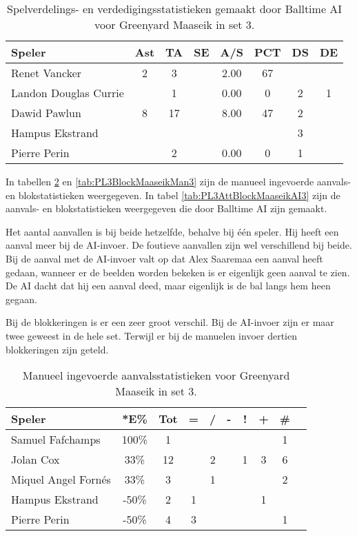 \begin{table}[ht!]
  \centering
  \scriptsize
    \begin{tabular}{|l|c|c|c|c|c|c|c|} \hline
    \textbf{Speler} & Ast & TA & SE & A/S & PCT & DS & DE \\ \hline
    Renet Vancker & 2 & 3 &  & 2.00 & 67 &   &   \\
    Landon Douglas Currie &  & 1 &  & 0.00 & 0 & 2 & 1 \\
    Dawid Pawlun & 8 & 17 & & 8.00 & 47 & 2 &  \\
    Hampus Ekstrand &  &  &  &  &  & 3 &  \\
    Pierre Perin &  & 2 &  & 0.00 & 0 & 1 &  \\ \hline
  \end{tabular}
  \caption[Spelverdelings- en verdedigingsstatistieken gemaakt door Balltime AI voor Greenyard Maaseik in set 3]{\label{tab:PL3SetDigMaaseikAI3}Spelverdelings- en verdedigingsstatistieken gemaakt door Balltime AI voor Greenyard Maaseik in set 3.}
\end{table}

In tabellen \ref{tab:PL3AttMaaseikMan3} en \ref{tab:PL3BlockMaaseikMan3} zijn de manueel ingevoerde aanvals- en blokstatistieken weergegeven. In tabel \ref{tab:PL3AttBlockMaaseikAI3} zijn de aanvals- en blokstatistieken weergegeven die door Balltime AI zijn gemaakt. 

Het aantal aanvallen is bij beide hetzelfde, behalve bij één speler. Hij heeft een aanval meer bij de AI-invoer. De foutieve aanvallen zijn wel verschillend bij beide. Bij de aanval met de AI-invoer valt op dat Alex Saaremaa een aanval heeft gedaan, wanneer er de beelden worden bekeken is er eigenlijk geen aanval te zien. De AI dacht dat hij een aanval deed, maar eigenlijk is de bal langs hem heen gegaan.

Bij de blokkeringen is er een zeer groot verschil. Bij de AI-invoer zijn er maar twee geweest in de hele set. Terwijl er bij de manuelen invoer dertien blokkeringen zijn geteld.

\begin{table}[ht!]
    \centering
    \scriptsize
    \begin{tabular}{|l|c|c|c|c|c|c|c|c|c|} \hline
        \textbf{Speler} & *E\% & Tot & = & / & - & ! & + & \#\\ \hline
        Samuel Fafchamps & 100\% & 1 &  &  &  &  &  & 1 \\ 
        Jolan Cox & 33\% & 12 &  & 2 &  & 1 & 3 & 6 \\ 
        Miquel Angel Fornés & 33\% & 3 &  & 1 &  &  &  & 2 \\ 
        Hampus Ekstrand & -50\% & 2 & 1 &  &  &  & 1 & \\ 
        Pierre Perin & -50\% & 4 & 3 &  &  &  &  & 1 \\ \hline
    \end{tabular}
    \caption[Manueel ingevoerde aanvalsstatistieken voor Greenyard Maaseik in set 3]{\label{tab:PL3AttMaaseikMan3}Manueel ingevoerde aanvalsstatistieken voor Greenyard Maaseik in set 3.}
\end{table}

